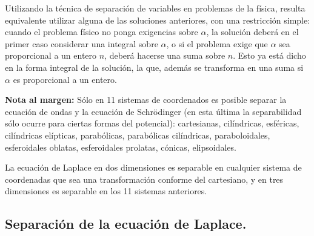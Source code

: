 Utilizando la técnica de separación de variables en problemas de la física, resulta equivalente utilizar alguna de las  soluciones anteriores, con una restricción simple: cuando el problema físico no ponga exigencias sobre $\alpha$, la solución deberá en el primer caso considerar una integral sobre $\alpha$, o si el problema exige que $\alpha$ sea proporcional a un entero $n$, deberá hacerse una suma sobre $n$. Esto ya está dicho en la forma integral de la solución, la que, además se transforma en una suma si $\alpha$ es proporcional a un entero.
\par
\textbf{Nota al margen: } Sólo en 11 sistemas de coordenados es posible separar la ecuación de ondas
y la ecuación de Schrödinger (en esta última la separabilidad sólo ocurre para ciertas formas del potencial): cartesianas, cilíndricas, esféricas, cilíndricas elípticas, parabólicas, parabólicas cilíndricas, paraboloidales, esferoidales oblatas, esferoidales prolatas, cónicas, elipsoidales.
\par
La ecuación de Laplace en dos dimensiones es separable en cualquier sistema de coordenadas que sea una transformación conforme del cartesiano, y en tres dimensiones es separable en los 11 sistemas anteriores.
\subsection{Separación de la ecuación de Laplace.}
